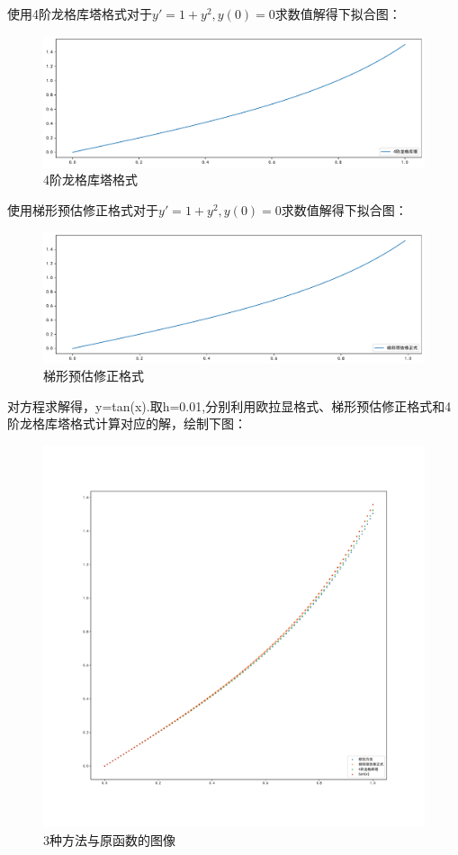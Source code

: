使用4阶龙格库塔格式对于$y'=1+y^2,y(0)=0$求数值解得下拟合图：

\begin{figure}[H]
	\centering
	\caption{4阶龙格库塔格式}
	\includegraphics[width=\linewidth]{6-2.pdf}
\end{figure}

使用梯形预估修正格式对于$y'=1+y^2,y(0)=0$求数值解得下拟合图：

\begin{figure}[H]
	\centering
	\caption{梯形预估修正格式}
	\includegraphics[width=\linewidth]{6-3.pdf}
\end{figure}






对方程求解得，y=tan(x).取h=0.01,分别利用欧拉显格式、梯形预估修正格式和4阶龙格库塔格式计算对应的解，绘制下图：


\begin{figure}[H]
	\centering
	\caption{3种方法与原函数的图像}
	\includegraphics[width=\linewidth]{6-4.pdf}
\end{figure}


